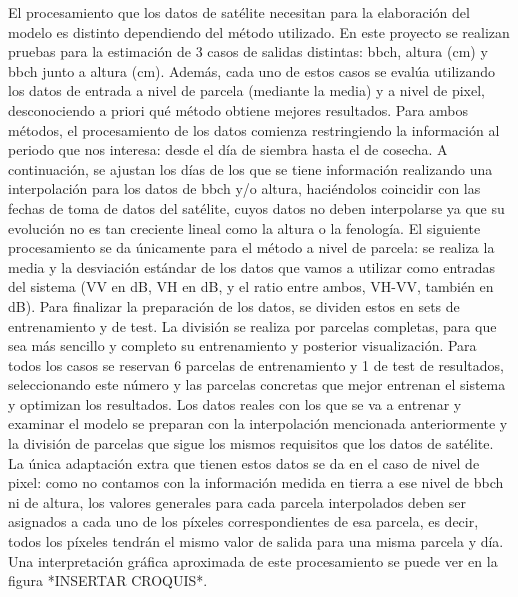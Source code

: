 \par  El procesamiento que los datos de satélite necesitan para la elaboración del modelo es distinto dependiendo del método utilizado. En este proyecto se realizan pruebas para la estimación de 3 casos de salidas distintas: \gls{bbch}, altura (cm) y \gls{bbch} junto a altura (cm). Además, cada uno de estos casos se evalúa utilizando los datos de entrada a nivel de parcela (mediante la media) y a nivel de pixel, desconociendo a priori qué método obtiene mejores resultados. Para ambos métodos, el procesamiento de los datos comienza restringiendo la información al periodo que nos interesa: desde el día de siembra hasta el de cosecha. A continuación, se ajustan los días de los que se tiene información realizando una interpolación para los datos de \gls{bbch} y/o altura, haciéndolos coincidir con las fechas de toma de datos del satélite, cuyos datos no deben interpolarse ya que su evolución no es tan creciente lineal como la altura o la fenología. El siguiente procesamiento se da únicamente para el método a nivel de parcela: se realiza la media y la desviación estándar de los datos que vamos a utilizar como entradas del sistema (VV en dB, VH en dB, y el ratio entre ambos, VH-VV, también en dB). Para finalizar la preparación de los datos, se dividen estos en sets de entrenamiento y de test. La división se realiza por parcelas completas, para que sea más sencillo y completo su entrenamiento y posterior visualización. Para todos los casos se reservan 6 parcelas de entrenamiento y 1 de test de resultados, seleccionando este número y las parcelas concretas que mejor entrenan el sistema y optimizan los resultados. Los datos reales con los que se va a entrenar y examinar el modelo se preparan con la interpolación mencionada anteriormente y la división de parcelas que sigue los mismos requisitos que los datos de satélite. La única adaptación extra que tienen estos datos se da en el caso de nivel de pixel: como no contamos con la información medida en tierra a ese nivel de \gls{bbch} ni de altura, los valores generales para cada parcela interpolados deben ser asignados a cada uno de los píxeles correspondientes de esa parcela, es decir, todos los píxeles tendrán el mismo valor de salida para una misma parcela y día. Una interpretación gráfica aproximada de este procesamiento se puede ver en la figura *INSERTAR CROQUIS*.
\\
